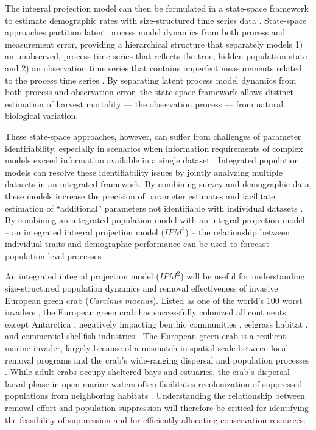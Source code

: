 \documentclass{article}
\begin{document}
The integral projection model can then be formulated in a state-space framework to estimate demographic rates with size-structured time series data \parencite{white2016fitting}. State-space approaches partition latent process model dynamics from both process and measurement error, providing a hierarchical structure that separately models 1) an unobserved, process time series that reflects the true, hidden population state and 2) an observation time series that contains imperfect measurements related to the process time series \parencite{auger2021guide}. By separating latent process model dynamics from both process and observation error, the state-space framework allows distinct estimation of harvest mortality — the observation process — from natural biological variation.

These state-space approaches, however, can suffer from challenges of parameter identifiability, especially in scenarios when information requirements of complex models exceed information available in a single dataset \parencite{auger2016state}. Integrated population models can resolve these identifiability issues by jointly analyzing multiple datasets in an integrated framework. By combining survey and demographic data, these models increase the precision of parameter estimates and facilitate estimation of “additional” parameters not identifiable with individual datasets \parencite{riecke2019integrated, abadi2010assessment}. By combining an integrated population model with an integral projection model – an integrated integral projection model ($IPM^2$) – the relationship between individual traits and demographic performance can be used to forecast population-level processes \parencite{plard2019ipm}.

An integrated integral projection model ($IPM^2$) will be useful for understanding size-structured population dynamics and removal effectiveness of invasive European green crab (\textit{Carcinus maenas}). Listed as one of the world’s 100 worst invaders \parencite{lowe2000100}, the European green crab has successfully colonized all continents except Antarctica \parencite{yamada2001global}, negatively impacting benthic communities \parencite{grosholz2005recent}, eelgrass habitat \parencite{garbary2014drastic, howard2019habitat}, and commercial shellfish industries \parencite{grosholz2011modeling}. The European green crab is a resilient marine invader, largely because of a mismatch in spatial scale between local removal programs and the crab’s wide-ranging dispersal and population processes \parencite{keller2025transition}. While adult crabs occupy sheltered bays and estuaries, the crab’s dispersal larval phase in open marine waters often facilitates recolonization of suppressed populations from neighboring habitats \parencite{yamada2021ocean}. Understanding the relationship between removal effort and population suppression will therefore be critical for identifying the feasibility of suppression and for efficiently allocating conservation resources. 
\end{document}
